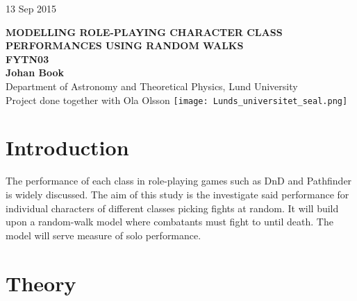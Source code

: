 \documentclass[a4paper,12pt]{article}
\begin{document}
\begin{titlepage}
\begin{flushright}
13 Sep 2015\\
\end{flushright}
\vfill
\begin{center}
{\large\bf MODELLING ROLE-PLAYING CHARACTER CLASS PERFORMANCES USING RANDOM WALKS\\[3mm] 
FYTN03}
\\[3cm]
{\bf Johan Book}
\\[5mm]
{Department of Astronomy and Theoretical Physics, Lund University}
\\[2cm]
{Project done together with Ola Olsson}
\vfill
\texttt{[image: Lunds\_universitet\_seal.png]}
\end{center}
\end{titlepage}
\thispagestyle{empty} %

\vfill

\vfill

\newpage

\tableofcontents

\newpage
\section{Introduction} \label{sec:Introduction}
The performance of each class in role-playing games such as DnD and Pathfinder is widely discussed.
The aim of this study is the investigate said performance for individual characters of different classes picking fights at random. 
It will build upon a random-walk model where combatants must fight to until death.
The model will serve measure of solo performance.

\newpage
\section{Theory}\label{sec:Theory}
\end{document}

